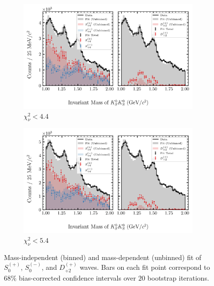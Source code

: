 \begin{figure}[htbp]
    \begin{subfigure}{0.45\textwidth}
        \includegraphics[width=\linewidth]{figures/binned_and_unbinned_fit_chisqdof_4.4_splot_D_1s_2b_phase_factor_waves29099_uncertainty_bootstrap-SE.png}
        \caption{$\chi^2_\nu < 4.4$}
    \end{subfigure}
    \hfill
    \begin{subfigure}{0.45\textwidth}
        \includegraphics[width=\linewidth]{figures/binned_and_unbinned_fit_chisqdof_5.4_splot_D_1s_2b_phase_factor_waves29099_uncertainty_bootstrap-SE.png}
        \caption{$\chi^2_\nu < 5.4$}
    \end{subfigure}

    \caption{Mass-independent (binned) and mass-dependent (unbinned) fit of $S_{0}^{(+)}$, $S_{0}^{(-)}$, and $D_{+2}^{(+)}$ waves. Bars on each fit point correspond to $68\%$ bias-corrected confidence intervals over $20$ bootstrap iterations.}
    \label{fig:unbinned-fit-all-Spn-D2p}
\end{figure}

